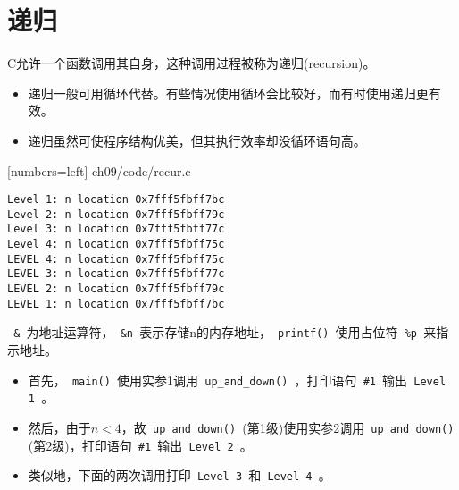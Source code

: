 \section{递归}

\begin{frame}[fragile]\ft{\secname}
C允许一个函数调用其自身，这种调用过程被称为递归(recursion)。 
\vspace{0.1in}

\begin{itemize}
\item 递归一般可用循环代替。有些情况使用循环会比较好，而有时使用递归更有效。\\[0.1in]
\item 递归虽然可使程序结构优美，但其执行效率却没循环语句高。
\end{itemize}
\end{frame}


\begin{frame}\ft{\secname}
  
  [numbers=left]
  {ch09/code/recur.c}
\end{frame}


\begin{frame}[fragile]\ft{\secname}
\begin{lstlisting}[backgroundcolor=\color{red!10}]
Level 1: n location 0x7fff5fbff7bc
Level 2: n location 0x7fff5fbff79c
Level 3: n location 0x7fff5fbff77c
Level 4: n location 0x7fff5fbff75c
LEVEL 4: n location 0x7fff5fbff75c
LEVEL 3: n location 0x7fff5fbff77c
LEVEL 2: n location 0x7fff5fbff79c
LEVEL 1: n location 0x7fff5fbff7bc
\end{lstlisting}
\end{frame}


\begin{frame}[fragile]\ft{\secname}
\lstinline| & |为地址运算符，\lstinline| &n |表示存储n的内存地址，\lstinline| printf() |使用占位符\lstinline| %p |来指示地址。
\end{frame}


\begin{frame}[fragile]
\begin{itemize}
\item 首先，\lstinline| main() |使用实参1调用\lstinline| up_and_down() |，打印语句\lstinline| #1 |输出\lstinline| Level 1 |。\\[0.1in]
\item 然后，由于$n<4$，故\lstinline| up_and_down() |(第1级)使用实参2调用\lstinline| up_and_down() |(第2级)，打印语句\lstinline| #1 |输出\lstinline| Level 2 |。\\[0.1in]
\item 类似地，下面的两次调用打印\lstinline| Level 3 |和\lstinline| Level 4 |。
\end{itemize}
\end{frame}


